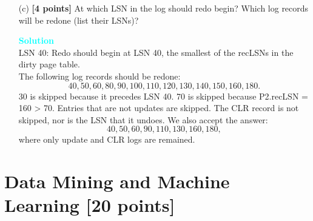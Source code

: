\documentclass[10pt]{article}
\newenvironment{solution}
    { \begin{mdframed}[backgroundcolor=gray!10] \textcolor{cyan}{\textbf{Solution}} \\}
    {  \end{mdframed}}
\begin{document}
\begin{enumerate}
\begin{itemize}
\begin{solution}
\begin{center}
			            \end{center}
		            \end{solution}
		      \item[(c)] \textbf{[4 points]} At which LSN in the log should redo begin? Which log records will be redone (list their LSNs)?
		            \begin{solution}
			            LSN 40: Redo should begin at LSN 40, the smallest of the recLSNs in the dirty page table. \\
			            The following log records should be redone:
			            \begin{equation*}
				            40, 50, 60, 80, 90, 100, 110, 120, 130, 140, 150, 160, 180.
			            \end{equation*}
			            30 is skipped because it precedes LSN 40. 70 is skipped because P2.recLSN = 160 > 70.
			            Entries that are not updates are
			            skipped. The CLR record is not skipped, nor is the LSN that it undoes.
			            We also accept the answer:
			            \begin{equation*}
				            40, 50, 60, 90, 110, 130, 160, 180,
			            \end{equation*}
			            where only update and CLR logs are remained.
		            \end{solution}
	      \end{itemize}
\end{enumerate}


\newpage
\section{Data Mining and Machine Learning \textbf{[20 points]}}
\end{document}
